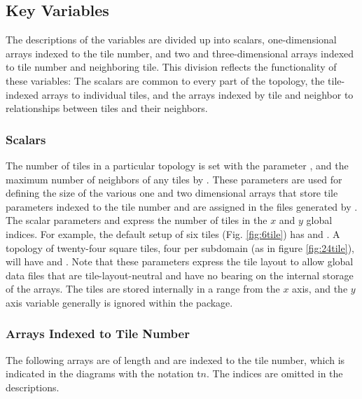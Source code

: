 \subsection{Key Variables}

The descriptions of the variables are divided up into scalars,
one-dimensional arrays indexed to the tile number, and two and
three-dimensional arrays indexed to tile number and neighboring tile.
This division reflects the functionality of these variables: The
scalars are common to every part of the topology, the tile-indexed
arrays to individual tiles, and the arrays indexed by tile and
neighbor to relationships between tiles and their neighbors. \\

\subsubsection{Scalars}

The number of tiles in a particular topology is set with the parameter
, and the maximum number of neighbors of any tiles by
.  These parameters are used for defining the
size of the various one and two dimensional arrays that store tile
parameters indexed to the tile number and are assigned in the files
generated by .\\

The scalar parameters 
and  express the number
of tiles in the $x$ and $y$ global indices.  For example, the default
setup of six tiles (Fig. \ref{fig:6tile}) has
 and .  A
topology of twenty-four square tiles, four per subdomain (as in figure
\ref{fig:24tile}), will have  and
.  Note that these parameters express the
tile layout to allow global data files that are tile-layout-neutral
and have no bearing on the internal storage of the arrays.  The tiles
are stored internally in a range from  the
$x$ axis, and the $y$ axis variable  generally is
ignored within the package. \\

\subsubsection{Arrays Indexed to Tile Number}

The following arrays are of length  and are indexed to
the tile number, which is indicated in the diagrams with the notation
\textsf{t}$n$.  The indices are omitted in the descriptions. \\


